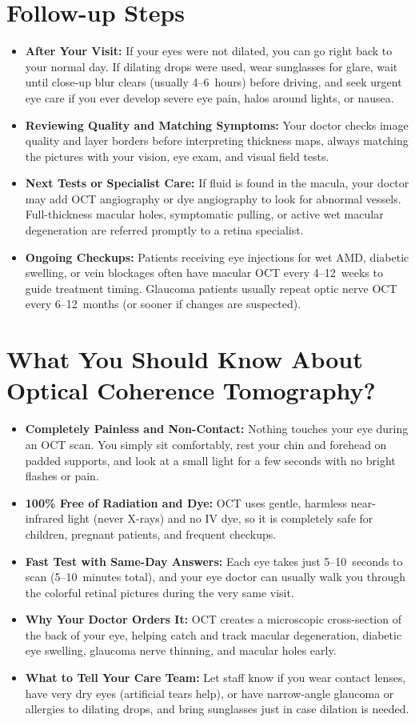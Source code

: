 \section{Follow-up Steps}
\begin{itemize}
\item \textbf{After Your Visit:} If your eyes were not dilated, you can go right back to your normal day. If dilating drops were used, wear sunglasses for glare, wait until close-up blur clears (usually 4--6~hours) before driving, and seek urgent eye care if you ever develop severe eye pain, halos around lights, or nausea.
\item \textbf{Reviewing Quality and Matching Symptoms:} Your doctor checks image quality and layer borders before interpreting thickness maps, always matching the pictures with your vision, eye exam, and visual field tests.
\item \textbf{Next Tests or Specialist Care:} If fluid is found in the macula, your doctor may add OCT angiography or dye angiography to look for abnormal vessels. Full-thickness macular holes, symptomatic pulling, or active wet macular degeneration are referred promptly to a retina specialist.
\item \textbf{Ongoing Checkups:} Patients receiving eye injections for wet AMD, diabetic swelling, or vein blockages often have macular OCT every 4--12~weeks to guide treatment timing. Glaucoma patients usually repeat optic nerve OCT every 6--12~months (or sooner if changes are suspected).
\end{itemize}

\section{What You Should Know About Optical Coherence Tomography?}
\begin{itemize}
\item \textbf{Completely Painless and Non-Contact:} Nothing touches your eye during an OCT scan. You simply sit comfortably, rest your chin and forehead on padded supports, and look at a small light for a few seconds with no bright flashes or pain.
\item \textbf{100\% Free of Radiation and Dye:} OCT uses gentle, harmless near-infrared light (never X-rays) and no IV dye, so it is completely safe for children, pregnant patients, and frequent checkups.
\item \textbf{Fast Test with Same-Day Answers:} Each eye takes just 5--10~seconds to scan (5--10~minutes total), and your eye doctor can usually walk you through the colorful retinal pictures during the very same visit.
\item \textbf{Why Your Doctor Orders It:} OCT creates a microscopic cross-section of the back of your eye, helping catch and track macular degeneration, diabetic eye swelling, glaucoma nerve thinning, and macular holes early.
\item \textbf{What to Tell Your Care Team:} Let staff know if you wear contact lenses, have very dry eyes (artificial tears help), or have narrow-angle glaucoma or allergies to dilating drops, and bring sunglasses just in case dilation is needed.
\end{itemize}

